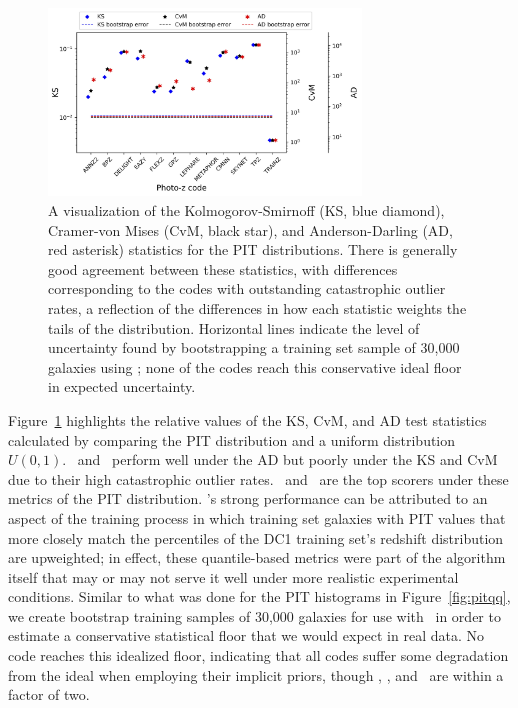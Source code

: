\begin{figure}
\centering
\includegraphics[width=0.74\textwidth]{fig/KSvsCvMvsAD_PIT_withnull_jpg.jpg}
\caption{A visualization of the Kolmogorov-Smirnoff (KS, blue diamond), Cramer-von Mises (CvM, black star), and Anderson-Darling (AD, red asterisk) statistics for the PIT distributions.
There is generally good agreement between these statistics, with differences corresponding to the codes with outstanding catastrophic outlier rates, a reflection of the differences in how each statistic weights the tails of the distribution.
Horizontal lines indicate the level of uncertainty found by bootstrapping a training set sample of 30,000 galaxies using \trainz; none of the codes reach this conservative ideal floor in expected uncertainty.}
\label{fig:pit_stats}
\end{figure}

Figure~\ref{fig:pit_stats} highlights the relative values of the KS, CvM, and AD test statistics calculated by comparing the PIT distribution and a uniform distribution $U(0, 1)$.
\metaphor\ and \lephare\ perform well under the AD but poorly under the KS and CvM due to their high catastrophic outlier rates.
\annz\ and \flexzboost\  are the top scorers under these metrics of the PIT distribution.
\annz's strong performance can be attributed to an aspect of the training process in which training set galaxies with PIT values that more closely match the percentiles of the DC1 training set's redshift distribution are upweighted; in effect, these quantile-based metrics were part of the algorithm itself that may or may not serve it well under more realistic experimental conditions.
Similar to what was done for the PIT histograms in Figure~\ref{fig:pitqq}, we create bootstrap training samples of 30,000 galaxies for use with \trainz\ in order to estimate a conservative statistical floor that we would expect in real data.
No code reaches this idealized floor, indicating that all codes suffer some degradation from the ideal when employing their implicit priors, though \annz, \flexzboost, and \gpz\ are within a factor of two.

